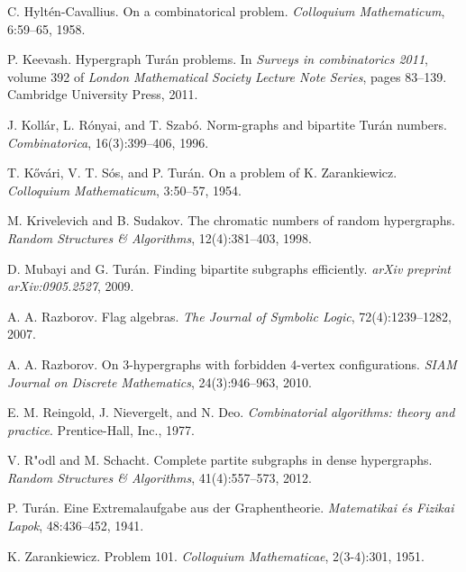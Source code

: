 \documentclass[11pt,a4paper]{article}
\theoremstyle{definition}
\begin{document}
\begin{thebibliography}{99}
C. Hyltén-Cavallius.
On a combinatorical problem.
\textit{Colloquium Mathematicum}, 6:59--65, 1958.

P. Keevash.
Hypergraph Turán problems.
In \textit{Surveys in combinatorics 2011}, volume 392 of \textit{London Mathematical Society Lecture Note Series}, pages 83--139. Cambridge University Press, 2011.

J. Kollár, L. Rónyai, and T. Szabó.
Norm-graphs and bipartite Turán numbers.
\textit{Combinatorica}, 16(3):399--406, 1996.

T. Kővári, V. T. Sós, and P. Turán.
On a problem of K. Zarankiewicz.
\textit{Colloquium Mathematicum}, 3:50–57, 1954.

M. Krivelevich and B. Sudakov.
The chromatic numbers of random hypergraphs.
\textit{Random Structures \& Algorithms}, 12(4):381--403, 1998.

D. Mubayi and G. Turán.
Finding bipartite subgraphs efficiently.
\textit{arXiv preprint arXiv:0905.2527}, 2009.

A. A. Razborov.
Flag algebras.
\textit{The Journal of Symbolic Logic}, 72(4):1239--1282, 2007.

A. A. Razborov.
On 3-hypergraphs with forbidden 4-vertex configurations.
\textit{SIAM Journal on Discrete Mathematics}, 24(3):946--963, 2010.

E. M. Reingold, J. Nievergelt, and N. Deo.
\textit{Combinatorial algorithms: theory and practice}.
Prentice-Hall, Inc., 1977.

V. R"odl and M. Schacht.
Complete partite subgraphs in dense hypergraphs.
\textit{Random Structures \& Algorithms}, 41(4):557--573, 2012.

P. Turán.
Eine Extremalaufgabe aus der Graphentheorie.
\textit{Matematikai és Fizikai Lapok}, 48:436--452, 1941.

K. Zarankiewicz.
Problem 101.
\textit{Colloquium Mathematicae}, 2(3-4):301, 1951.

\end{thebibliography}
\end{document}
